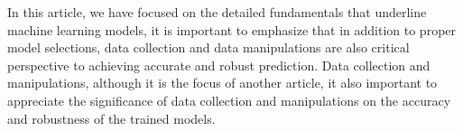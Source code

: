 
\par
In this article, we have focused on the detailed fundamentals that underline machine learning models, it is important to emphasize that in addition to proper model selections, data collection and data manipulations are also critical perspective to achieving accurate and robust prediction. Data collection and manipulations, although it is the focus of another article, it also important to appreciate the significance of data collection and manipulations on the accuracy and robustness of the trained models.
\par 
